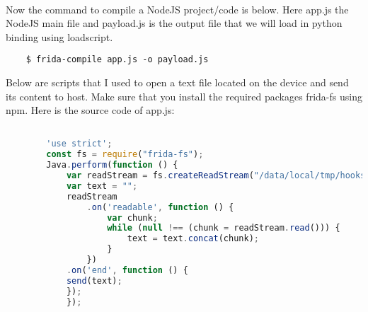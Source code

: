 \documentclass[../main.tex]{subfile}
\begin{document}
	\paragraph{} Now the command to compile a NodeJS project/code is below. Here app.js the NodeJS main file and payload.js is the output file that we will load in python binding using load\textunderscore script.
	\begin{lstlisting}
	$ frida-compile app.js -o payload.js
	\end{lstlisting}
	
	Below are scripts that I used to open a text file located on the device and send its content to host. Make sure that you install the required packages frida-fs \cite{frida_fs} using npm. Here is the source code of app.js:
	
	\begin{lstlisting}[language=JavaScript]

		'use strict';		
		const fs = require("frida-fs");
		Java.perform(function () {
			var readStream = fs.createReadStream("/data/local/tmp/hooks.json");
			var text = "";
			readStream
				.on('readable', function () {
					var chunk;
					while (null !== (chunk = readStream.read())) {
						text = text.concat(chunk);
					}
				})
			.on('end', function () {
			send(text);
			});
			});
	\end{lstlisting}
\end{document}
